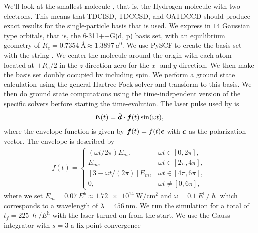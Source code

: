         We'll look at the smallest molecule , that is, the
        Hydrogen-molecule with two electrons.
        This means that TDCISD, TDCCSD, and OATDCCD should produce exact
        results for the single-particle basis that is used.
        We express  in $14$ Gaussian type orbitals, that is, the
        6-311++G(d, p) basis set, with an equilibrium geometry of $R_e =
        \SI{0.7354}{\angstrom} \approx \SI{1.3897}{\bohr}$.
        We use PySCF \cite{pyscf} to create the basis set with the string
        .
        We center the molecule around the origin with each atom located at
        $\pm R_e/2$ in the $z$-direction zero for the $x$- and
        $y$-direction.
        We then make the basis set doubly occupied by including spin.
        We perform a ground state calculation using the general Hartree-Fock
        solver and transform to this basis.
        We then do ground state computations using the time-independent version
        of the specific solvers berfore starting the time-evolution.
        The laser pulse used by \citeauthor{li_2005} is
        \begin{align}
            \boldsymbol{E}(t)
            = \hat{\boldsymbol{d}} \cdot \boldsymbol{f}(t)\sin(\omega t),
            \label{eq:li-field}
        \end{align}
        where the envelope function is given by $\boldsymbol{f}(t) =
        f(t)\boldsymbol{\epsilon}$ with $\boldsymbol{\epsilon}$ as the polarization vector.
        The envelope is described by
        \begin{align}
            f(t) = \begin{cases}
                (\omega t / 2\pi) E_m, & \omega t \in [0, 2\pi], \\
                E_m, & \omega t \in [2\pi, 4\pi], \\
                [3 - \omega t / (2\pi)] E_m, & \omega t \in [4\pi, 6\pi], \\
                0, & \omega t \neq [0, 6\pi],
            \end{cases}
            \label{eq:li-laser}
        \end{align}
        where we set $E_m = \SI{0.07}{\hartree} \approx
        \SI{1.72e14}{\watt/\cm^2}$ and $\omega =
        \SI{0.1}{\hartree/\hslash}$ which corresponds to a wavelength of
        $\lambda = \SI{456}{\nano\meter}$.
        We run the simulation for a total of $t_f = \SI{225}{\hslash/\hartree}$
        with the laser turned on from the start.
        We use the Gauss-integrator with $s = 3$ a fix-point convergence
